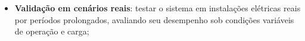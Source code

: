 \begin{itemize}

    \item \textbf{Validação em cenários reais}: testar o sistema em instalações elétricas reais por períodos prolongados, avaliando seu desempenho sob condições variáveis de operação e carga;

\end{itemize}